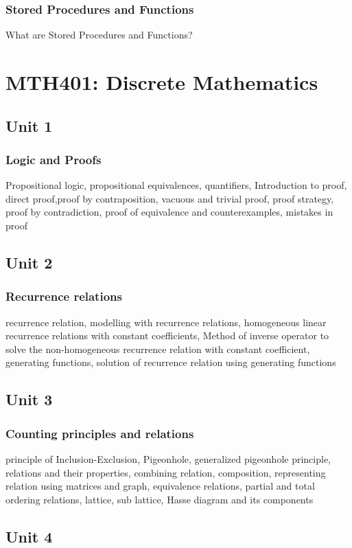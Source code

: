 \documentclass[twocolumn]{article}
\begin{document}
    \subsubsection*{Stored Procedures and Functions}
    What are Stored Procedures and Functions?
    \section*{MTH401: Discrete Mathematics}
    \subsection*{Unit 1}
    \subsubsection*{Logic and Proofs}
    Propositional logic, propositional equivalences, quantifiers, Introduction to proof, direct proof,proof by contraposition, vacuous and trivial proof, proof strategy, proof by contradiction, proof of equivalence and counterexamples, mistakes in proof
    \subsection*{Unit 2}
    \subsubsection*{Recurrence relations}
    recurrence relation, modelling with recurrence relations, homogeneous linear recurrence relations with constant coefficients, Method of inverse operator to solve the non-homogeneous recurrence relation with constant coefficient, generating functions, solution of recurrence relation using generating functions
    \subsection*{Unit 3}
    \subsubsection*{Counting principles and relations}
    principle of Inclusion-Exclusion, Pigeonhole, generalized 
    pigeonhole principle, relations and their properties, combining relation, composition, representing relation using matrices and graph, equivalence relations, partial and total ordering relations, lattice, sub lattice, Hasse diagram and its components
    \subsection*{Unit 4}
\end{document}
